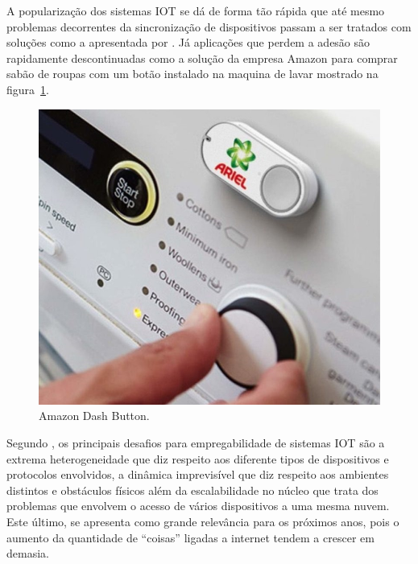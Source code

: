 A popularização dos sistemas IOT se dá de forma tão rápida que até mesmo problemas decorrentes da sincronização de dispositivos passam a ser tratados com soluções como a apresentada por . Já aplicações que perdem a adesão são rapidamente descontinuadas como a solução da empresa Amazon para comprar sabão de roupas com um botão instalado na maquina de lavar mostrado na figura~\ref{fig:amazon}.

\begin{figure}
  \caption{Amazon Dash Button.}
  \begin{center}
      \includegraphics[scale=0.6]{img/Amazon-Dash-Button.png}
  \end{center}
  \label{fig:amazon}
\end{figure}

Segundo , os principais desafios para empregabilidade de sistemas IOT são a extrema heterogeneidade que diz respeito aos diferente tipos de dispositivos e protocolos envolvidos, a dinâmica imprevisível que diz respeito aos ambientes distintos e obstáculos físicos além da escalabilidade no núcleo que trata dos problemas que envolvem o acesso de vários dispositivos a uma mesma nuvem. Este último, se apresenta como grande relevância para os próximos anos, pois o aumento da quantidade de ``coisas'' ligadas a internet tendem a crescer em demasia.










